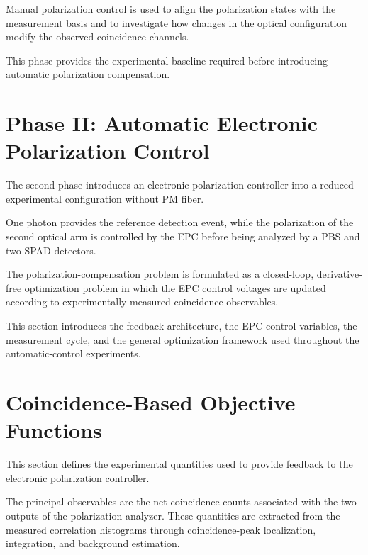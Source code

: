 Manual polarization control is used to align the polarization states with the
measurement basis and to investigate how changes in the optical configuration
modify the observed coincidence channels.

This phase provides the experimental baseline required before introducing
automatic polarization compensation.



\section{Phase II: Automatic Electronic Polarization Control}
\label{sec:phase2_epc}

The second phase introduces an electronic polarization controller into a reduced
experimental configuration without PM fiber.

One photon provides the reference detection event, while the polarization of the
second optical arm is controlled by the EPC before being analyzed by a PBS and
two SPAD detectors.

The polarization-compensation problem is formulated as a closed-loop,
derivative-free optimization problem in which the EPC control voltages are
updated according to experimentally measured coincidence observables.

This section introduces the feedback architecture, the EPC control variables,
the measurement cycle, and the general optimization framework used throughout
the automatic-control experiments.



\section{Coincidence-Based Objective Functions}
\label{sec:epc_objective_functions}

This section defines the experimental quantities used to provide feedback to the
electronic polarization controller.

The principal observables are the net coincidence counts associated with the two
outputs of the polarization analyzer. These quantities are extracted from the
measured correlation histograms through coincidence-peak localization,
integration, and background estimation.

